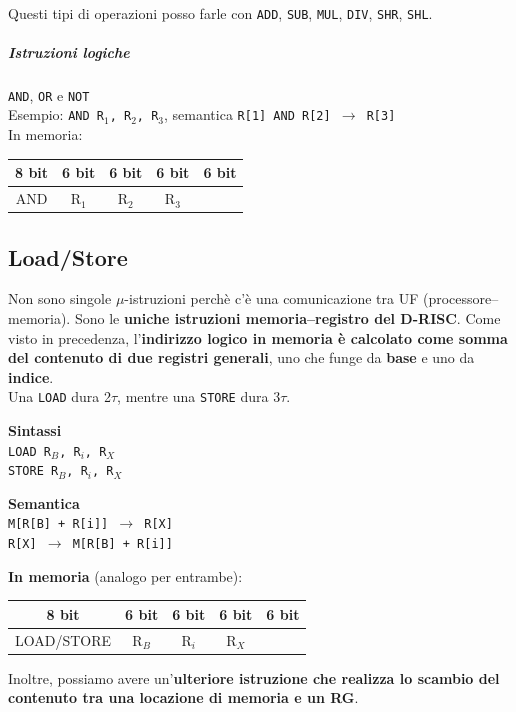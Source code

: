 \documentclass[10pt]{report}
\begin{document}
\paragraph{} Questi tipi di operazioni posso farle con \texttt{ADD}, \texttt{SUB}, \texttt{MUL}, \texttt{DIV}, \texttt{SHR}, \texttt{SHL}.
\subparagraph{Istruzioni logiche} \texttt{AND}, \texttt{OR} e \texttt{NOT}\\
Esempio: \texttt{AND R$_1$, R$_2$, R$_3$}, semantica \texttt{R[1] AND R[2] $\rightarrow$ R[3]}\\
In memoria: \begin{tabular}{| c | c | c | c | c |}
\hline
8 bit & 6 bit & 6 bit & 6 bit & 6 bit\\
\hline
AND & R$_1$ & R$_2$ & R$_3$  & \\
\hline
\end{tabular}
\pagebreak
\subsection{Load/Store}
Non sono singole $\mu$-istruzioni perchè c'è una comunicazione tra UF (processore--memoria). Sono le \textbf{uniche istruzioni memoria--registro del D-RISC}. Come visto in precedenza, l'\textbf{indirizzo logico in memoria è calcolato come somma del contenuto di due registri generali}, uno che funge da \textbf{base} e uno da \textbf{indice}.\\
Una \texttt{LOAD} dura 2$\tau$, mentre una \texttt{STORE} dura 3$\tau$.
\begin{multicols}{2}
\begin{center}
\textbf{Sintassi}\\
\texttt{LOAD R$_B$, R$_i$, R$_X$}\\
\texttt{STORE R$_B$, R$_i$, R$_X$}
\end{center}
\columnbreak
\begin{center}
\textbf{Semantica}\\
\texttt{M[R[B] + R[i]] $\rightarrow$ R[X]}\\
\texttt{R[X] $\rightarrow$ M[R[B] + R[i]]}
\end{center}
\end{multicols}
\begin{center}
\textbf{In memoria} (analogo per entrambe):  
\begin{tabular}{| c | c | c | c | c |}
\hline
8 bit & 6 bit & 6 bit & 6 bit & 6 bit\\
\hline
LOAD/STORE & R$_B$ & R$_i$ & R$_X$  & \\
\hline
\end{tabular}
\end{center}
Inoltre, possiamo avere un'\textbf{ulteriore istruzione che realizza lo scambio del contenuto tra una locazione di memoria e un RG}.
\end{document}
